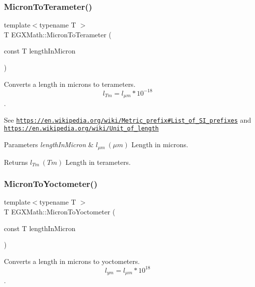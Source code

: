 \subsubsection{\texorpdfstring{Micron\+To\+Terameter()}{MicronToTerameter()}}
{\footnotesize\ttfamily template$<$typename T $>$ \\
T E\+G\+X\+Math\+::\+Micron\+To\+Terameter (\begin{DoxyParamCaption}\item[{const T}]{length\+In\+Micron }\end{DoxyParamCaption})}



Converts a length in microns to terameters. \[ l_{Tm}=l_{\mu m} * 10^{-18} \]. 

See \href{https://en.wikipedia.org/wiki/Metric_prefix#List_of_SI_prefixes}{\tt https\+://en.\+wikipedia.\+org/wiki/\+Metric\+\_\+prefix\#\+List\+\_\+of\+\_\+\+S\+I\+\_\+prefixes} and \href{https://en.wikipedia.org/wiki/Unit_of_length}{\tt https\+://en.\+wikipedia.\+org/wiki/\+Unit\+\_\+of\+\_\+length} 
\begin{DoxyParams}{Parameters}
{\em length\+In\+Micron} & $ l_{\mu m}\ (\mu m)$ Length in microns. \\
\hline
\end{DoxyParams}
\begin{DoxyReturn}{Returns}
$ l_{Tm}\ (Tm)$ Length in terameters. 
\end{DoxyReturn}
\mbox{\label{group___e_g_x_math-_conversions-_length_conversions-_non-_s_i-_micron-_s_i_ga7a8a8c3b2da69390b326436deaffd582}} 
\subsubsection{\texorpdfstring{Micron\+To\+Yoctometer()}{MicronToYoctometer()}}
{\footnotesize\ttfamily template$<$typename T $>$ \\
T E\+G\+X\+Math\+::\+Micron\+To\+Yoctometer (\begin{DoxyParamCaption}\item[{const T}]{length\+In\+Micron }\end{DoxyParamCaption})}



Converts a length in microns to yoctometers. \[ l_{ym}=l_{\mu m} * 10^{18} \]. 

